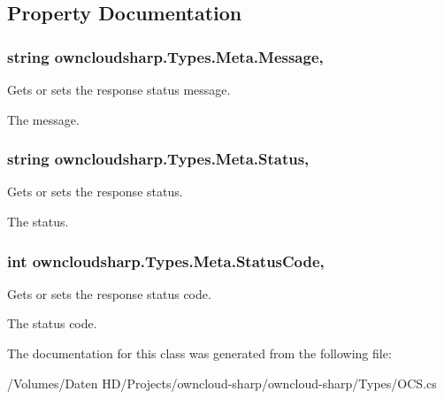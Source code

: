 \subsection{Property Documentation}
\hypertarget{classowncloudsharp_1_1_types_1_1_meta_a2dcb4b0826692240c02ee824cd84b62b}{}
\subsubsection[{Message}]{\setlength{\rightskip}{0pt plus 5cm}string owncloudsharp.\+Types.\+Meta.\+Message\hspace{0.3cm}{\ttfamily [get]}, {\ttfamily [set]}}\label{classowncloudsharp_1_1_types_1_1_meta_a2dcb4b0826692240c02ee824cd84b62b}


Gets or sets the response status message. 

The message.\hypertarget{classowncloudsharp_1_1_types_1_1_meta_acdc52e0c7e0df65d17a7247e1527f518}{}
\subsubsection[{Status}]{\setlength{\rightskip}{0pt plus 5cm}string owncloudsharp.\+Types.\+Meta.\+Status\hspace{0.3cm}{\ttfamily [get]}, {\ttfamily [set]}}\label{classowncloudsharp_1_1_types_1_1_meta_acdc52e0c7e0df65d17a7247e1527f518}


Gets or sets the response status. 

The status.\hypertarget{classowncloudsharp_1_1_types_1_1_meta_a8322438609748cc7c0fca4984daf39c2}{}
\subsubsection[{Status\+Code}]{\setlength{\rightskip}{0pt plus 5cm}int owncloudsharp.\+Types.\+Meta.\+Status\+Code\hspace{0.3cm}{\ttfamily [get]}, {\ttfamily [set]}}\label{classowncloudsharp_1_1_types_1_1_meta_a8322438609748cc7c0fca4984daf39c2}


Gets or sets the response status code. 

The status code.

The documentation for this class was generated from the following file\+:\begin{DoxyCompactItemize}
\item 
/\+Volumes/\+Daten H\+D/\+Projects/owncloud-\/sharp/owncloud-\/sharp/\+Types/O\+C\+S.\+cs\end{DoxyCompactItemize}
